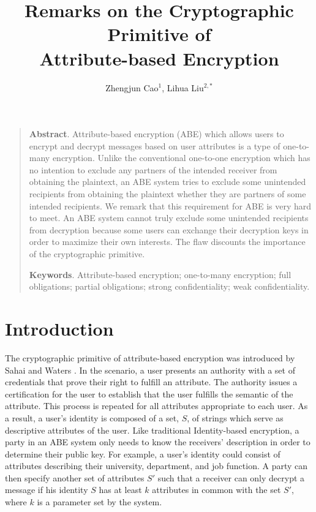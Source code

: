 \documentclass[11pt]{article}
\begin{document}
 \title{Remarks on the Cryptographic Primitive of\\ Attribute-based Encryption }

 \author{Zhengjun Cao$^{1}$, \qquad Lihua Liu$^{2,*}$}

\date{}
\maketitle

\begin{quotation}
 \textbf{Abstract}.   Attribute-based encryption (ABE) which allows users to
encrypt and decrypt messages based on user attributes is a type of one-to-many encryption.
Unlike the conventional one-to-one encryption which has no intention to exclude any partners of the intended receiver from obtaining the plaintext, an ABE system tries to exclude some unintended recipients from obtaining the plaintext whether they are partners of some intended recipients. We remark that this requirement for ABE is very hard to meet.  An ABE system  cannot truly exclude some unintended recipients from decryption because some users can exchange their decryption keys  in order to maximize their own interests.  The flaw discounts the importance of the cryptographic primitive.

 \textbf{Keywords}.  Attribute-based encryption; one-to-many encryption; full obligations; partial obligations;  strong confidentiality; weak confidentiality.
 \end{quotation}

\section{Introduction}
The cryptographic primitive of attribute-based encryption was introduced by Sahai and Waters \cite{SW05}.
 In the scenario, a user presents an authority with a set of credentials
that prove their right to fulfill an attribute. The authority issues a certification for the user to establish that the
user fulfills the semantic of the attribute.
This process is repeated for all attributes appropriate to
each user.  As a result, a user's identity is composed
of a set, $S$, of strings which serve as descriptive attributes
of the user. Like traditional Identity-based encryption, a
party in an ABE system only needs to know the receivers' description in order to determine their
public key.
 For example, a user's identity could
consist of attributes describing their university, department,
and job function. A party  can then specify
another set of attributes $S'$ such that a receiver can only
decrypt a message if his identity $S$ has at least $k$ attributes
in common with the set $S'$, where $k$ is a parameter set by
the system.
\end{document}
